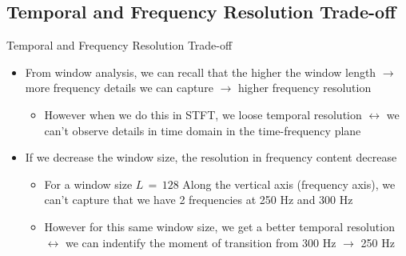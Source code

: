 \subsection{Temporal and Frequency Resolution Trade-off}
\begin{frame}[t,allowframebreaks]{Temporal and Frequency Resolution Trade-off}

\begin{itemize}

\item From window analysis, we can recall that the higher the window length $\rightarrow$ more frequency details we can capture $\rightarrow$ higher frequency resolution

	\begin{itemize}
	\item However when we do this in STFT, we loose temporal resolution $\leftrightarrow$ we can't observe details in time domain in the time-frequency plane
	\end{itemize}

\item If we decrease the window size, the resolution in frequency content decrease

	\begin{itemize}
	\item For a window size $L \, = \, 128$ Along the vertical axis (frequency axis), we can't capture that we have 2 frequencies at 250 Hz and 300 Hz
	
	\item However for this same window size, we get a better temporal resolution $\leftrightarrow$ we can indentify the moment of transition from 300 Hz $\rightarrow$ 250 Hz
	\end{itemize}


\end{itemize}


\end{frame}

